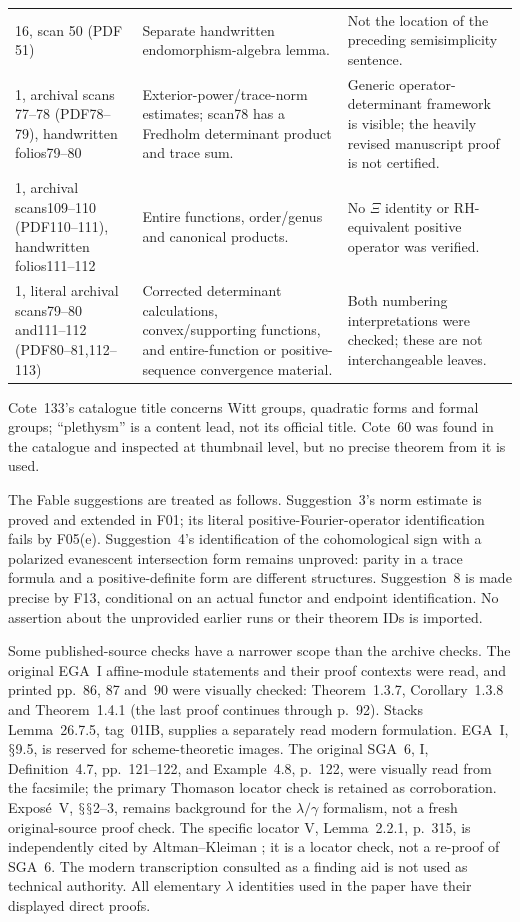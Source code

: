 \documentclass[11pt,a4paper]{article}
\renewcommand{\S}{\ensuremath{\mathsection}}
\newcommand{\fid}[1]{\textsf{#1}}\newcommand{\gate}[1]{\textsf{#1}}
\theoremstyle{named}\newtheorem{finding}{Finding}[section]
\theoremstyle{definition}\newtheorem{definition}[finding]{Definition}
\theoremstyle{remark}\newtheorem{remark}[finding]{Remark}
\begin{document}
{\begin{longtable}{p{.19\linewidth}p{.36\linewidth}p{.37\linewidth}}
16, scan 50 (PDF 51)&Separate handwritten endomorphism-algebra lemma.&Not the location of the preceding semisimplicity sentence.\\
1, archival scans 77--78 (PDF78--79), handwritten folios79--80&Exterior-power/trace-norm estimates; scan78 has a Fredholm determinant product and trace sum.&Generic operator-determinant framework is visible; the heavily revised manuscript proof is not certified.\\
1, archival scans109--110 (PDF110--111), handwritten folios111--112&Entire functions, order/genus and canonical products.&No $\Xi$ identity or RH-equivalent positive operator was verified.\\
1, literal archival scans79--80 and111--112 (PDF80--81,112--113)&Corrected determinant calculations, convex/supporting functions, and entire-function or positive-sequence convergence material.&Both numbering interpretations were checked; these are not interchangeable leaves.\\\bottomrule
\end{longtable}}
Cote~133's catalogue title concerns Witt groups, quadratic forms and formal groups; ``plethysm'' is a content lead, not its official title. Cote~60 was found in the catalogue and inspected at thumbnail level, but no precise theorem from it is used.

The Fable suggestions are treated as follows. Suggestion~3's norm estimate is proved and extended in \fid{F01}; its literal positive-Fourier-operator identification fails by \fid{F05}(e). Suggestion~4's identification of the cohomological sign with a polarized evanescent intersection form remains unproved: parity in a trace formula and a positive-definite form are different structures. Suggestion~8 is made precise by \fid{F13}, conditional on an actual functor and endpoint identification. No assertion about the unprovided earlier runs or their theorem IDs is imported.

Some published-source checks have a narrower scope than the archive checks.
The original EGA~I affine-module statements and their proof
contexts were read, and printed pp.~86, 87 and~90 were visually
checked: Theorem~1.3.7, Corollary~1.3.8 and Theorem~1.4.1
(the last proof continues through p.~92). Stacks Lemma~26.7.5,
tag~01IB, supplies a separately read modern formulation.
EGA~I, \S9.5, is reserved for scheme-theoretic images.
The original SGA~6, I, Definition~4.7, pp.~121--122, and
Example~4.8, p.~122, were visually read from the facsimile;
the primary Thomason locator check
\cite[\S3.1, pp.~8--9]{ThomasonPerfect} is retained as
corroboration. Expos\'e~V, \S\S2--3, remains background for
the $\lambda/\gamma$ formalism, not a fresh original-source
proof check. The specific locator V, Lemma~2.2.1, p.~315, is independently cited by Altman--Kleiman \cite[\S2.10]{AK}; it is a locator check, not a re-proof of SGA~6. The modern transcription consulted as a finding aid is not used as technical authority. All elementary $\lambda$ identities used in the paper have their displayed direct proofs.
\end{document}
